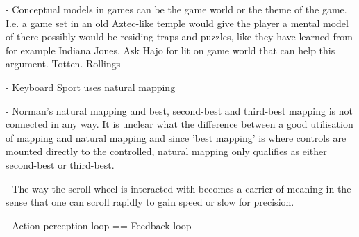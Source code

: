 - Conceptual models in games can be the game world or the theme of the game. I.e. a game set in an old Aztec-like temple would give the player a mental model of there possibly would be residing traps and puzzles, like they have learned from for example Indiana Jones. Ask Hajo for lit on game world that can
help this argument. Totten. Rollings

- Keyboard Sport uses natural mapping

- Norman's natural mapping and best, second-best and third-best mapping is not connected in any way. It is unclear what the difference between a good utilisation of mapping and natural mapping and since 'best mapping' is where controls are mounted directly to the controlled, natural mapping only qualifies as either second-best or third-best.

- The way the scroll wheel is interacted with becomes a carrier of meaning in the sense that one can scroll rapidly to gain speed or slow for precision.

- Action-perception loop == Feedback loop
